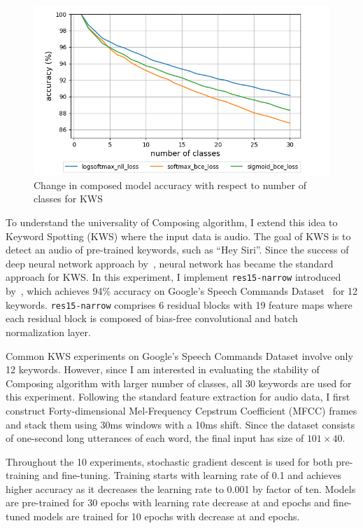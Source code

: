 \documentclass{article}
\begin{document}
\begin{figure}[t]
    \centering
    \includegraphics[scale=0.4,trim={0mm 0mm 0mm 0mm},clip]{kws.png}
    \caption{Change in composed model accuracy with respect to number of classes for KWS}
    \label{figure:composed_kws}
\end{figure}


To understand the universality of Composing algorithm, I extend this idea to Keyword Spotting (KWS) where the input data is audio. The goal of KWS is to detect an audio of pre-trained keywords, such as “Hey Siri”. Since the success of deep neural network approach by~\cite{chen2014small}, neural network has became the standard approach for KWS. In this experiment, I implement \texttt{res15-narrow} introduced by~\cite{tang2018deep}, which achieves 94\% accuracy on Google’s Speech Commands Dataset~\cite{speechcommandsdataset} for 12 keywords. \texttt{res15-narrow} comprises 6 residual blocks with 19 feature maps where each residual block is composed of bias-free convolutional and batch normalization layer.

Common KWS experiments on Google’s Speech Commands Dataset involve only 12 keywords. However, since I am interested in evaluating the stability of Composing algorithm with larger number of classes, all 30 keywords are used for this experiment. Following the standard feature extraction for audio data, I first construct Forty-dimensional Mel-Frequency Cepstrum Coefficient (MFCC) frames and stack them using 30ms windows with a 10ms shift. Since the dataset consists of one-second long utterances of each word, the final input has size of $101\times40$.

Throughout the 10 experiments, stochastic gradient descent is used for both pre-training and fine-tuning. Training starts with learning rate of 0.1 and achieves higher accuracy as it decreases the learning rate to 0.001 by factor of ten. Models are pre-trained for 30 epochs with learning rate decrease at  and  epochs and fine-tuned models are trained for 10 epochs with decrease at  and  epochs.
\end{document}
